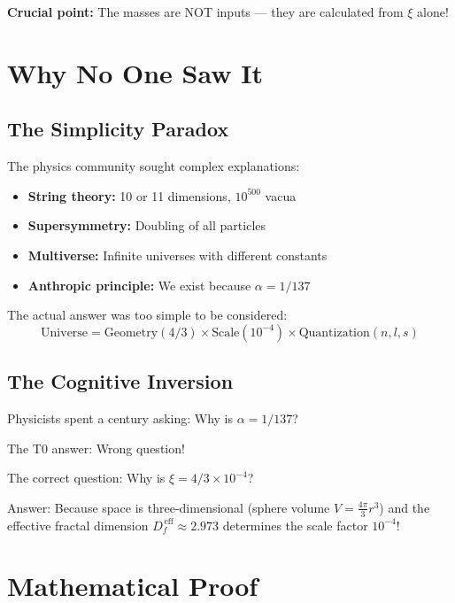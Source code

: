 	\textbf{Crucial point:} The masses are NOT inputs — they are calculated from $\xi$ alone!
	
	\section{Why No One Saw It}
	
	\subsection{The Simplicity Paradox}
	
	The physics community sought complex explanations:
	
	\begin{itemize}
		\item \textbf{String theory:} 10 or 11 dimensions, $10^{500}$ vacua
		\item \textbf{Supersymmetry:} Doubling of all particles
		\item \textbf{Multiverse:} Infinite universes with different constants
		\item \textbf{Anthropic principle:} We exist because $\alpha = 1/137$
	\end{itemize}
	
	The actual answer was too simple to be considered:
	\begin{equation}
		\boxed{\text{Universe} = \text{Geometry}(4/3) \times \text{Scale}(10^{-4}) \times \text{Quantization}(n,l,s)}
	\end{equation}
	
	\subsection{The Cognitive Inversion}
	
	\begin{tcolorbox}[colback=purple!5!white,colframe=purple!75!black,title=Discovery]
		Physicists spent a century asking: Why is $\alpha = 1/137$?
		
		The T0 answer: Wrong question!
		
		The correct question: Why is $\xi = 4/3 \times 10^{-4}$?
		
		Answer: Because space is three-dimensional (sphere volume $V = \frac{4\pi}{3} r^3$) and the effective fractal dimension $D_f^{\,\text{eff}} \approx 2.973$ determines the scale factor $10^{-4}$!
	\end{tcolorbox}
	
	\section{Mathematical Proof}
	
